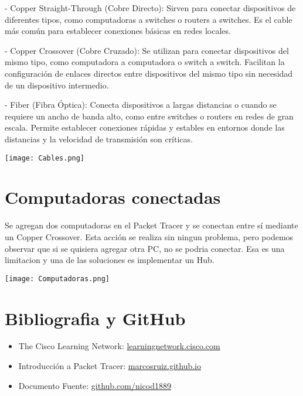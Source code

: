 \documentclass{article}
\begin{document}
- Copper Straight-Through (Cobre Directo): Sirven para conectar dispositivos de diferentes tipos, como computadoras a switches o routers a switches. Es el cable más común para establecer conexiones básicas en redes locales.

- Copper Crossover (Cobre Cruzado): Se utilizan para conectar dispositivos del mismo tipo, como computadora a computadora o switch a switch. Facilitan la configuración de enlaces directos entre dispositivos del mismo tipo sin necesidad de un dispositivo intermedio.

- Fiber (Fibra Óptica): Conecta dispositivos a largas distancias o cuando se requiere un ancho de banda alto, como entre switches o routers en redes de gran escala. Permite establecer conexiones rápidas y estables en entornos donde las distancias y la velocidad de transmisión son críticas.

\begin{center}
    \texttt{[image: Cables.png]}
\end{center}


\section{Computadoras conectadas}
Se agregan dos computadoras en el Packet Tracer y se conectan entre sí mediante un Copper Crossover. Esta acción se realiza sin ningun problema, pero podemos observar que si se quisiera agregar otra PC, no se podria conectar. Esa es una limitacion y una de las soluciones es implementar un Hub.

\begin{center}
    \texttt{[image: Computadoras.png]}
\end{center}

\section{Bibliografia y GitHub}

\begin{itemize}
    \item {The Cisco Learning Network}: \href{https://learningnetwork.cisco.com/s/article/el-software-de-simulacion-cisco-packet-tracer}{learningnetwork.cisco.com}
    \item {Introducción a Packet Tracer}: \href{https://marcosruiz.github.io/posts/tutorial-introduccion-a-packet-tracer/}{marcosruiz.github.io}
    \item {Documento Fuente}: \href{https://github.com/nicod1889/Introduccion-a-Packet-Tracer}{github.com/nicod1889}
\end{itemize}
\end{document}
